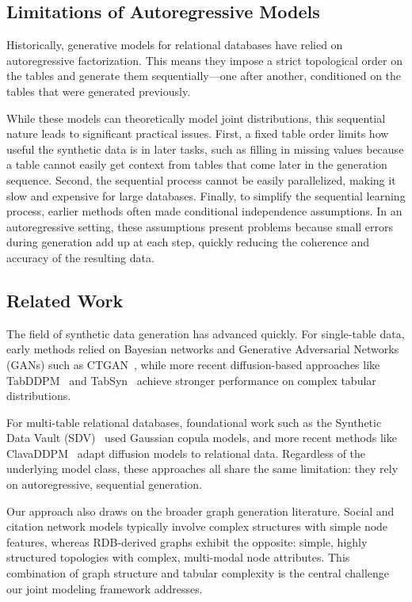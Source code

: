 \documentclass[manuscript,review]{acmart}
\begin{document}
\subsection{Limitations of Autoregressive Models}
Historically, generative models for relational databases have relied on autoregressive factorization. This means they impose a strict topological order on the tables and generate them sequentially—one after another, conditioned on the tables that were generated previously. 

While these models can theoretically model joint distributions, this sequential nature leads to significant practical issues. First, a fixed table order limits how useful the synthetic data is in later tasks, such as filling in missing values because a table cannot easily get context from tables that come later in the generation sequence. Second, the sequential process cannot be easily parallelized, making it slow and expensive for large databases. Finally, to simplify the sequential learning process, earlier methods often made conditional independence assumptions. In an autoregressive setting, these assumptions present problems because small errors during generation add up at each step, quickly reducing the coherence and accuracy of the resulting data.

\subsection{Related Work}
The field of synthetic data generation has advanced quickly. For single-table data, early methods relied on Bayesian networks and Generative Adversarial Networks (GANs) such as CTGAN~\cite{NEURIPS2019_254ed7d2}, while more recent diffusion-based approaches like TabDDPM~\cite{pmlr-v202-kotelnikov23a} and TabSyn~\cite{zhang2024mixedtypetabulardatasynthesis} achieve stronger performance on complex tabular distributions.

For multi-table relational databases, foundational work such as the Synthetic Data Vault (SDV)~\cite{7796926} used Gaussian copula models, and more recent methods like ClavaDDPM~\cite{NEURIPS2024_98387657} adapt diffusion models to relational data. Regardless of the underlying model class, these approaches all share the same limitation: they rely on autoregressive, sequential generation.

Our approach also draws on the broader graph generation literature. Social and citation network models typically involve complex structures with simple node features, whereas RDB-derived graphs exhibit the opposite: simple, highly structured topologies with complex, multi-modal node attributes. This combination of graph structure and tabular complexity is the central challenge our joint modeling framework addresses.
\end{document}
